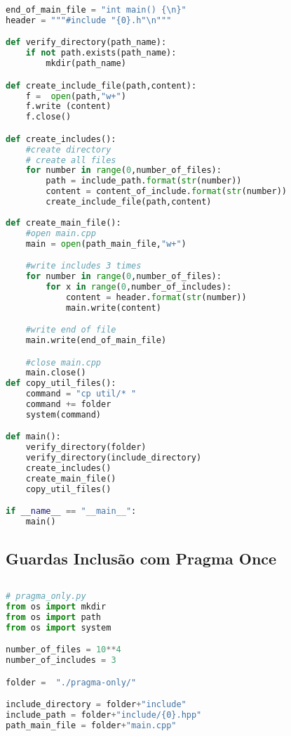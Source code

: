 \begin{apendicesenv}
\begin{lstlisting}[language=Python, caption={
    Script \textit{Pragma Once} primeiro que Guardas de Inclusão Interna},label=script_pragma_guards_include]
end_of_main_file = "int main() {\n}"
header = """#include "{0}.h"\n"""

def verify_directory(path_name):
    if not path.exists(path_name):
        mkdir(path_name)

def create_include_file(path,content):
    f =  open(path,"w+")
    f.write (content)
    f.close()

def create_includes():
    #create directory
    # create all files
    for number in range(0,number_of_files):
        path = include_path.format(str(number))
        content = content_of_include.format(str(number))
        create_include_file(path,content)
    
def create_main_file():
    #open main.cpp
    main = open(path_main_file,"w+")

    #write includes 3 times
    for number in range(0,number_of_files):
        for x in range(0,number_of_includes):
            content = header.format(str(number))
            main.write(content)

    #write end of file
    main.write(end_of_main_file)

    #close main.cpp
    main.close()
def copy_util_files():                                                           
    command = "cp util/* "                                                       
    command += folder                                                            
    system(command)                                                              

def main():
    verify_directory(folder)
    verify_directory(include_directory)
    create_includes()
    create_main_file()
    copy_util_files()

if __name__ == "__main__":
    main()
\end{lstlisting}

\subsection{Guardas Inclusão com Pragma Once}
\begin{lstlisting}[language=Python, caption={
                     Script Pragma Once},
             label=script_pragma_once_include]
             
# pragma_only.py
from os import mkdir
from os import path
from os import system

number_of_files = 10**4
number_of_includes = 3

folder =  "./pragma-only/"

include_directory = folder+"include"
include_path = folder+"include/{0}.hpp"
path_main_file = folder+"main.cpp"


\end{lstlisting}
\end{apendicesenv}
